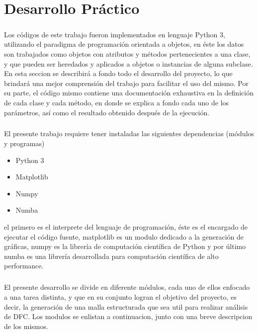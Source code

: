 \documentclass[letterpaper, openright, 12pt]{book}
\begin{document}
\chapter{Desarrollo Práctico}
    \paragraph*{}
    Los códigos de este trabajo fueron implementados en lenguaje Python 3,
    utilizando el paradigma de programación orientada a objetos, en éste los
    datos son trabajados como objetos con atributos y métodos pertenecientes
    a una clase, y que pueden ser heredados y aplicados a objetos o
    instancias de alguna subclase. En esta seccion se describirá a fondo todo
    el desarrollo del proyecto, lo que brindará una mejor comprensión del
    trabajo para facilitar el uso del mismo. Por su parte, el código mismo
    contiene una documentación exhaustiva en la definición de cada clase y
    cada método, en donde se explica a fondo cada uno de los parámetros, así
    como el resultado obtenido después de la ejecución.

    \paragraph*{}
    El presente trabajo requiere tener instaladas las siguientes dependencias
    (módulos y programas)
    \begin{itemize}
        \item Python 3
        \item Matplotlib
        \item Numpy
        \item Numba
    \end{itemize}
    el primero es el interprete del lenguaje de programación, éste es el
    encargado de ejecutar el código fuente, matplotlib es un modulo dedicado
    a la generación de gráficas, numpy es la librería de computación
    científica de Python y por último numba es una librería desarrollada
    para computación científica de alto performance.

    \paragraph*{}
    El presente desarrollo se divide en diferente módulos, cada uno de ellos
    enfocado a una tarea distinta, y que en su conjunto logran el objetivo del
    proyecto, es decir, la generación de una malla estructurada que sea util
    para realizar análisis de DFC\@. Los modulos se enlistan a continuacion,
    junto con una breve descripcion de los mismos.
\end{document}
